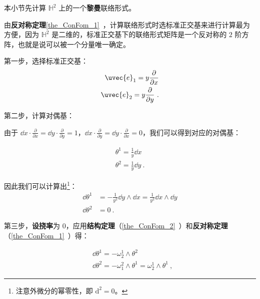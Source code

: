
本小节先计算 $\mathbb{H}^2$ 上的一个\textbf{黎曼}联络形式。

由\textbf{反对称定理}\autoref{the_ConFom_1}~，计算联络形式时选标准正交基来进行计算最为方便，因为 $\mathbb{H}^2$ 是二维的，标准正交基下的联络形式矩阵是一个反对称的 $2$ 阶方阵，也就是说可以被一个分量唯一确定。

第一步，选择标准正交基：
\begin{equation}
\begin{aligned}
\uvec{e}_1=y\frac{\partial}{\partial x}\\
\uvec{e}_2=y\frac{\partial}{\partial y}~.
\end{aligned}
\end{equation}

第二步，计算对偶基：

由于 $\dd x\cdot \frac{\partial }{\partial x}=\dd y\cdot \frac{\partial}{\partial y}=1$，$\dd x\cdot \frac{\partial }{\partial y}=\dd y\cdot \frac{\partial}{\partial x}=0$，我们可以得到对应的对偶基：

\begin{equation}\label{eq_PoiHP_1}
\begin{aligned}
\theta^1=\frac{1}{y}\dd x\\
\theta^2=\frac{1}{y}\dd y~.
\end{aligned}
\end{equation}

因此我们可以计算出\footnote{注意外微分的幂零性，即 $\mathrm{d}^2=0$。}：
\begin{equation}\label{eq_PoiHP_2}
\begin{aligned}
\dd\theta^1&=-\frac{1}{y^2}\dd y\wedge\dd x=\frac{1}{y^2}\dd x\wedge \dd y\\
\dd\theta^2&=0~.
\end{aligned}
\end{equation}

第三步，\textbf{设挠率}为 $0$，应用\textbf{结构定理}（\autoref{the_ConFom_2}~）和\textbf{反对称定理}（\autoref{the_ConFom_1}~）得：

\begin{equation}\label{eq_PoiHP_3}
\begin{aligned}
&\dd\theta^1=-\omega^1_2\wedge\theta^2\\
&\dd\theta^2=-\omega^2_1\wedge\theta^1=\omega^1_2\wedge\theta^1~,
\end{aligned}
\end{equation}



